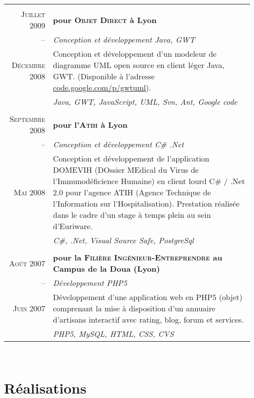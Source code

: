 \documentclass[a4paper,10pt]{article}
\begin{document}
\begin{supertabular}{r|p{11cm}}
   \\
  \textsc{Juillet 2009} & \textbf{pour \textsc{Objet Direct} à Lyon} \\
  -- & \emph{Conception et développement Java, GWT} \\
  \footnotesize{\textsc{Décembre 2008}}& \footnotesize{Conception et développement d’un modeleur de diagramme UML open source en client léger Java, GWT. (Disponible à l’adresse \href{http://code.google.com/p/gwtuml/}{code.google.com/p/gwtuml}).} \\
  & \emph{Java, GWT, JavaScript, UML, Svn, Ant, Google code} \\


   \\
  \textsc{Septembre 2008} & \textbf{pour l’\textsc{Atih} à Lyon} \\
  -- & \emph{Conception et développement C\# .Net} \\
  \footnotesize{\textsc{Mai 2008}} & \footnotesize{Conception et développement de l’application DOMEVIH (DOssier MEdical du Virus de l’Immunodéficience Humaine) en client lourd C\# / .Net 2.0 pour l’agence ATIH (Agence Technique de l’Information sur l’Hospitalisation). Prestation réalisée dans le cadre d’un stage à temps plein au sein d’Euriware.} \\
  & \emph{C\#, .Net, Visual Source Safe, PostgreSql} \\


   \\
  \textsc{Août 2007} & \textbf{pour la \textsc{Filière Ingénieur-Entreprendre} au Campus de la Doua (Lyon)} \\
  -- & \emph{Développement PHP5} \\
  \footnotesize{\textsc{Juin 2007}} & \footnotesize{Développement d’une application web en PHP5 (objet) comprenant la mise à disposition d’un annuaire d’artisans interactif avec rating, blog, forum et services.} \\
  & \emph{PHP5, MySQL, HTML, CSS, CVS} \\

\end{supertabular} \\

\section{Réalisations}
\end{document}
